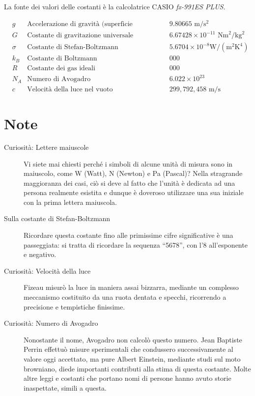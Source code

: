 
\vspace*{0.5cm}
La fonte dei valori delle costanti è la calcolatrice CASIO
\textit{fx-991ES PLUS}.

\begin{align*}
    &g      & \text{Accelerazione di gravità (superficie terrestre)} && 9.80665 \text{ m}/\text{s}^2\\
    &G      & \text{Costante di gravitazione universale}             && 6.67428 \times 10^{-11} \text{ Nm}^2/\text{kg}^2\\
    &\sigma & \text{Costante di Stefan-Boltzmann}                    && 5.6704 \times 10^{-8} \text{W}/(\text{m}^2\text{K}^4)\\
    &k_B    & \text{Costante di Boltzmann}                           && 000\\
    &R      & \text{Costante dei gas ideali}                         && 000\\
    &N_A    & \text{Numero di Avogadro}                              && 6.022 \times 10^{23}\\
    &c      & \text{Velocità della luce nel vuoto}                   && 299,792,458 \text{ m}/\text{s}
\end{align*}

\section*{Note}
\begin{description}
    \item[Curiosità: Lettere maiuscole] Vi siete mai chiesti perché
    i simboli di alcune unità di misura sono in maiuscolo, come
    W (Watt), N (Newton) e Pa (Pascal)? Nella
    stragrande maggioranza dei casi, ciò si deve al fatto che l'unità
    è dedicata ad una persona realmente esistita e dunque è doveroso utilizzare una sua iniziale con la
    prima lettera maiuscola.

    \item[Sulla costante di Stefan-Boltzmann] Ricordare questa costante
    fino alle primissime cifre significative è una passeggiata: si
    tratta di ricordare la sequenza ``5678'', con l'8 all'esponente
    e negativo.

    \item[Curiosità: Velocità della luce] Fizeau misurò la luce in
    maniera assai bizzarra, mediante un complesso meccanismo costituito
    da una ruota dentata e specchi, ricorrendo a precisione
    e tempistiche finissime.

    \item[Curiosità: Numero di Avogadro] Nonostante il nome, Avogadro
    non calcolò questo numero. Jean Baptiste Perrin effettuò misure
    sperimentali che condussero successivamente al valore oggi accettato,
    ma pure Albert Einstein, mediante studi sul moto browniano, diede
    importanti contributi alla stima di questa costante. Molte altre
    leggi e costanti che portano nomi di persone hanno avuto storie
    inaspettate, simili a questa.
\end{description}